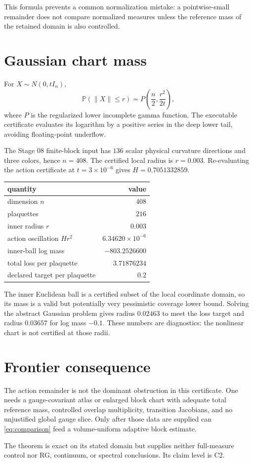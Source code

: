 \documentclass[11pt]{article}
\begin{document}
This formula prevents a common normalization mistake: a pointwise-small
remainder does not compare normalized measures unless the reference mass of
the retained domain is also controlled.

\section{Gaussian chart mass}

For $X\sim N(0,tI_n)$,
\[
 \mathbb P(\|X\|\leq r)=
 P\!\left(\frac n2,\frac{r^2}{2t}\right),
\]
where $P$ is the regularized lower incomplete gamma function.  The executable
certificate evaluates its logarithm by a positive series in the deep lower
tail, avoiding floating-point underflow.

The Stage 08 finite-block input has $136$ scalar physical curvature
directions and three colors, hence $n=408$.  The certified local radius is
$r=0.003$.  Re-evaluating the action certificate at $t=3\times10^{-6}$ gives
$H=0.7051332859$.

\begin{center}
\begin{tabular}{@{}lr@{}}
\toprule
quantity & value\\
\midrule
dimension $n$ & $408$\\
plaquettes & $216$\\
inner radius $r$ & $0.003$\\
action oscillation $Hr^2$ & $6.34620\times10^{-6}$\\
inner-ball log mass & $-803.2526600$\\
total loss per plaquette & $3.71876234$\\
declared target per plaquette & $0.2$\\
\bottomrule
\end{tabular}
\end{center}

The inner Euclidean ball is a certified subset of the local coordinate
domain, so its mass is a valid but potentially very pessimistic coverage lower
bound.  Solving the abstract Gaussian problem gives radius $0.02463$ to meet
the loss target and radius $0.03657$ for log mass $-0.1$.  These numbers are
diagnostics: the nonlinear chart is not certified at those radii.

\section{Frontier consequence}

The action remainder is not the dominant obstruction in this certificate.
One needs a gauge-covariant atlas or enlarged block chart with adequate total
reference mass, controlled overlap multiplicity, transition Jacobians, and no
unjustified global gauge slice.  Only after those data are supplied can
\eqref{eq:comparison} feed a volume-uniform adaptive block estimate.

The theorem is exact on its stated domain but supplies neither full-measure
control nor RG, continuum, or spectral conclusions.  Its claim level is C2.
\end{document}
